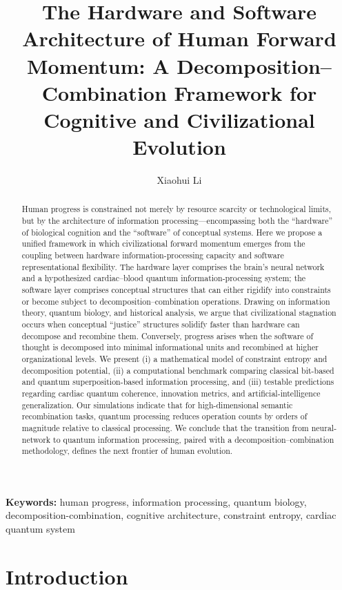 \documentclass[11pt,a4paper]{article}
\title{\textbf{The Hardware and Software Architecture of Human Forward Momentum: A Decomposition--Combination Framework for Cognitive and Civilizational Evolution}}
\author{Xiaohui Li}
\affil{Independent Researcher, Baoji, China}
\affil{\texttt{Correspondence: danceluck@163.com}}
\affil{ORCID: 0009-0003-8233-7191}
\affil{Data homepage: \url{https://github.com/xiaohui-li-lab/}}
\date{}
\begin{document}
\maketitle

\begin{abstract}
Human progress is constrained not merely by resource scarcity or technological limits, but by the architecture of information processing---encompassing both the ``hardware'' of biological cognition and the ``software'' of conceptual systems. Here we propose a unified framework in which civilizational forward momentum emerges from the coupling between hardware information-processing capacity and software representational flexibility. The hardware layer comprises the brain's neural network and a hypothesized cardiac--blood quantum information-processing system; the software layer comprises conceptual structures that can either rigidify into constraints or become subject to decomposition--combination operations. Drawing on information theory, quantum biology, and historical analysis, we argue that civilizational stagnation occurs when conceptual ``justice'' structures solidify faster than hardware can decompose and recombine them. Conversely, progress arises when the software of thought is decomposed into minimal informational units and recombined at higher organizational levels. We present (i) a mathematical model of constraint entropy and decomposition potential, (ii) a computational benchmark comparing classical bit-based and quantum superposition-based information processing, and (iii) testable predictions regarding cardiac quantum coherence, innovation metrics, and artificial-intelligence generalization. Our simulations indicate that for high-dimensional semantic recombination tasks, quantum processing reduces operation counts by orders of magnitude relative to classical processing. We conclude that the transition from neural-network to quantum information processing, paired with a decomposition--combination methodology, defines the next frontier of human evolution.
\end{abstract}

\noindent\textbf{Keywords:} human progress, information processing, quantum biology, decomposition-combination, cognitive architecture, constraint entropy, cardiac quantum system

\section{Introduction}
\end{document}
